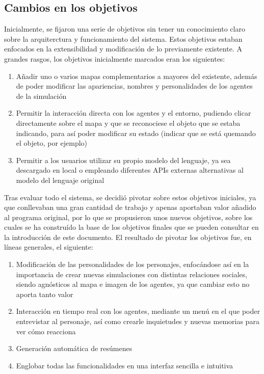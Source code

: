 \subsection{Cambios en los objetivos}

Inicialmente, se fijaron una serie de objetivos sin tener un conocimiento claro sobre la arquiterctura y funcionamiento del sistema. Estos objetivos estaban enfocados en la extensibilidad y modificación de lo previamente existente. A grandes rasgos, los objetivos inicialmente marcados eran los siguientes:

\begin{enumerate}
	\item Añadir uno o varios mapas complementarios a mayores del existente, además de poder modificar las apariencias, nombres y personalidades de los agentes de la simulación
	
	\item Permitir la interacción directa con los agentes y el entorno, pudiendo clicar directamente sobre el mapa y que se reconociese el objeto que se estaba indicando, para así poder modificar su estado (indicar que se está quemando el objeto, por ejemplo)
	
	\item Permitir a los usuarios utilizar su propio modelo del lenguaje, ya sea descargado en local o empleando diferentes APIs externas alternativas al modelo del lenguaje original
\end{enumerate}

Tras evaluar todo el sistema, se decidió pivotar sobre estos objetivos iniciales, ya que conllevaban una gran cantidad de trabajo y apenas aportaban valor añadido al programa original, por lo que se propusieron unos nuevos objetivos, sobre los cuales se ha construído la base de los objetivos finales que se pueden consultar en la introducción de este documento. El resultado de pivotar los objetivos fue, en líneas generales, el siguiente:

\begin{enumerate}
	\item Modificación de las personalidades de los personajes, enfocándose así en la importancia de crear nuevas simulaciones con distintas relaciones sociales, siendo agnósticos al mapa e imagen de los agentes, ya que cambiar esto no aporta tanto valor
	
	\item Interacción en tiempo real con los agentes, mediante un menú en el que poder entrevistar al personaje, así como crearle inquietudes y nuevas memorias para ver cómo reacciona
	
	\item Generación automática de resúmenes
	
	\item Englobar todas las funcionalidades en una interfaz sencilla e intuitiva
\end{enumerate}


